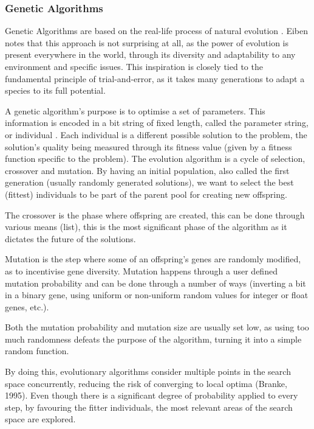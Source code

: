 \documentclass[12pt,a4paper]{article}
\begin{document}
\subsubsection{Genetic Algorithms}
Genetic Algorithms are based on the real-life process of natural evolution \cite{agoston_e._eiben_introduction_2015}. Eiben notes that this approach is not surprising at all, as the power of evolution is present everywhere in the world, through its diversity and adaptability to any environment and specific issues. This inspiration is closely tied to the fundamental principle of trial-and-error, as it takes many generations to adapt a species to its full potential.\par
A genetic algorithm’s purpose is to optimise a set of parameters. This information is encoded in a bit string of fixed length, called the parameter string, or individual \cite{goldberg_genetic_1988}. Each individual is a different possible solution to the problem, the solution’s quality being measured through its fitness value (given by a fitness function specific to the problem). The evolution algorithm is a cycle of selection, crossover and mutation. By having an initial population, also called the first generation (usually randomly generated solutions), we want to select the best (fittest) individuals to be part of the parent pool for creating new offspring.\par
The crossover is the phase where offspring are created, this can be done through various means (list), this is the most significant phase of the algorithm as it dictates the future of the solutions.\par
Mutation is the step where some of an offspring’s genes are randomly modified, as to incentivise gene diversity. Mutation happens through a user defined mutation probability and can be done through a number of ways (inverting a bit in a binary gene, using uniform or non-uniform random values for integer or float genes, etc.).\par
Both the mutation probability and mutation size are usually set low, as using too much randomness defeats the purpose of the algorithm, turning it into a simple random function.\par
By doing this, evolutionary algorithms consider multiple points in the search space concurrently, reducing the risk of converging to local optima (Branke, 1995). Even though there is a significant degree of probability applied to every step, by favouring the fitter individuals, the most relevant areas of the search space are explored.\par
\end{document}
